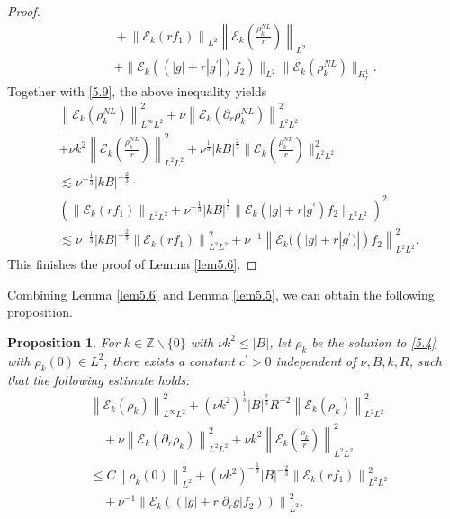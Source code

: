 \documentclass[final, 12pt,reqno]{amsart}
\newtheorem{proposition}[theorem]{\bf Proposition}
\numberwithin{equation}{section}
\begin{document}
\begin{proof}
$$\begin{aligned}
   &\quad+\left\|\mathcal{E}_k (r f_1)\right\|_{L^2}\left\|\mathcal{E}_k (\frac{\rho_k^{NL}}{r})\right\|_{L^2} \\
        & \quad+\| \mathcal{E}_k(\left(|g|+r\left|g^{\prime}\right| \right)f_2)\|_{L^2}\| \mathcal{E}_k (\rho_k^{NL} )\|_{H_r^1}.
    \end{aligned}
    $$
    Together with \eqref{5.9}, the above inequality yields
        $$
    \begin{aligned}
        & \left\|\mathcal{E}_k(\rho_k^{NL})\right\|_{L^{\infty} L^2}^2+\nu\left\|\mathcal{E}_k (\partial_r \rho_k^{NL})\right\|_{L^2 L^2}^2\\
   &+\nu k^2\left\|\mathcal{E}_k (\frac{\rho_k^{NL}}{r})\right\|_{L^2 L^2}^2
        +\nu^{\frac{1}{3}}|k B|^{\frac{2}{3}} \| \mathcal{E}_k(\frac{\rho_k^{NL}}{r}) \|_{L^2 L^2}^2 \\
        & \lesssim \nu^{-\frac{1}{3}}|k B|^{-\frac{2}{3}}\cdot\\
   &\left(\left\|\mathcal{E}_k (r f_1)\right\|_{L^2 L^2}+\nu^{-\frac{1}{3}}|k B|^{\frac{1}{3}} \| \mathcal{E}_k\left(|g|+r|g^{\prime}\right)  f_2 \|_{L^2 L^2}\right)^2 \\
        & \lesssim \nu^{-\frac{1}{3}}|k B|^{-\frac{2}{3}}\left\|\mathcal{E}_k (r f_1)\right\|_{L^2 L^2}^2+\nu^{-1}\left\|\mathcal{E}_k(\left(|g|+r\left|g^{\prime})\right|\right) f_2\right\|_{L^2 L^2}^2 .
    \end{aligned}
    $$
 This finishes the proof of Lemma \ref{lem5.6}.
 \end{proof}
   Combining Lemma \ref{lem5.6} and Lemma \ref{lem5.5}, we can obtain the following proposition.
 \begin{proposition}\label{pro5.7}
    For $k \in \mathbb{Z} \backslash\{0\}$ with  $\nu k^2\leq |B|$, let $\rho_k$ be the solution to \eqref{5.4} with $\rho_k(0) \in L^2$, there exists a constant $c^{\prime}>0$ independent of $\nu, B, k, R$, such that the following estimate holds:
    $$
    \begin{aligned}
        &   \left\|\mathcal{E}_k(\rho_k)\right\|_{L^\infty L^2}^2 +\left(\nu k^2\right)^{\frac{1}{3}}|B|^{\frac{2}{3}} R^{-2}\left\|\mathcal{E}_k(\rho_k)\right\|_{L^2 L^2}^2\\
        &\quad+ \nu\left\|\mathcal{E}_k(\partial_{r}\rho_k)\right\|_{L^2L^2}^2 +\nu k^2\left\|\mathcal{E}_k(\frac{\rho_k}{r})\right\|_{L^2L^2}^2\\
        &\leq C\left\|\rho_k(0)\right\|_{L^2}^2+\left(\nu k^2\right)^{-\frac{1}{3}}|B|^{-\frac{2}{3}}\left\|\mathcal{E}_k (rf_1)\right\|_{L^2 L^2}^2\\
        &\quad+\nu^{-1}\left\|\mathcal{E}_k((|g|+r|\partial_{r}g|f_2))\right\|_{L^2}^2.
    \end{aligned}
    $$
    \end{proposition}
\end{document}
